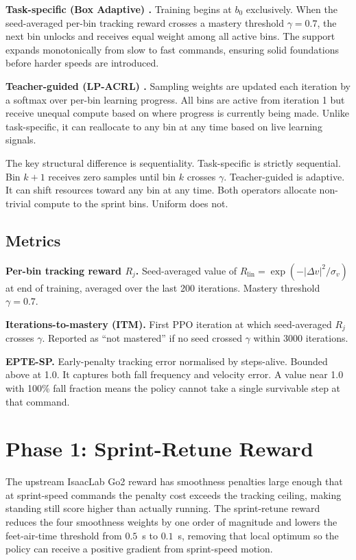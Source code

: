 \documentclass[a4paper,11pt]{article}
\begin{document}
    \textbf{Task-specific (Box Adaptive) \cite{margolis2022}.} Training begins at $b_0$ exclusively. When the seed-averaged per-bin tracking reward crosses a mastery threshold $\gamma = 0.7$, the next bin unlocks and receives equal weight among all active bins. The support expands monotonically from slow to fast commands, ensuring solid foundations before harder speeds are introduced.

    \textbf{Teacher-guided (LP-ACRL) \cite{li2026}.} Sampling weights are updated each iteration by a softmax over per-bin learning progress. All bins are active from iteration 1 but receive unequal compute based on where progress is currently being made. Unlike task-specific, it can reallocate to any bin at any time based on live learning signals.

    The key structural difference is sequentiality. Task-specific is strictly sequential. Bin $k+1$ receives zero samples until bin $k$ crosses $\gamma$. Teacher-guided is adaptive. It can shift resources toward any bin at any time. Both operators allocate non-trivial compute to the sprint bins. Uniform does not.

    \subsection{Metrics}

    \textbf{Per-bin tracking reward $R_j$.} Seed-averaged value of $R_{\mathrm{lin}} = \exp(-|\Delta v|^2/\sigma_v)$ at end of training, averaged over the last 200 iterations. Mastery threshold $\gamma = 0.7$.

    \textbf{Iterations-to-mastery (ITM).} First PPO iteration at which seed-averaged $R_j$ crosses $\gamma$. Reported as ``not mastered'' if no seed crossed $\gamma$ within 3000 iterations.

    \textbf{EPTE-SP.} Early-penalty tracking error normalised by steps-alive. Bounded above at 1.0. It captures both fall frequency and velocity error. A value near 1.0 with 100\% fall fraction means the policy cannot take a single survivable step at that command.

    \section{Phase 1: Sprint-Retune Reward}

    The upstream IsaacLab Go2 reward has smoothness penalties large enough that at sprint-speed commands the penalty cost exceeds the tracking ceiling, making standing still score higher than actually running. The sprint-retune reward reduces the four smoothness weights by one order of magnitude and lowers the feet-air-time threshold from $0.5$~s to $0.1$~s, removing that local optimum so the policy can receive a positive gradient from sprint-speed motion.
\end{document}
